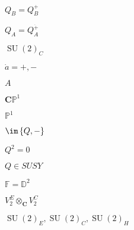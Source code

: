 \begin{preview}
\setcounter{equation}{0}%
\( Q_B = Q_B^+ \)
\end{preview}

\begin{preview}
\setcounter{equation}{0}%
\( Q_A = Q_A^{\dot{+}} \)
\end{preview}

\begin{preview}
\setcounter{equation}{0}%
\( \operatorname{SU}(2)_C \)
\end{preview}

\begin{preview}
\setcounter{equation}{0}%
\( \dot{a} = +,- \)
\end{preview}

\begin{preview}
\setcounter{equation}{0}%
\( A \)
\end{preview}

\begin{preview}
\setcounter{equation}{0}%
\( \mathbf{C}\mathbb{P}^1 \)
\end{preview}

\begin{preview}
\setcounter{equation}{0}%
\( \mathbb{P}^1 \)
\end{preview}

\begin{preview}
\setcounter{equation}{0}%
\( \im \left\{ Q,- \right\} \)
\end{preview}

\begin{preview}
\setcounter{equation}{0}%
\( Q ^2=0\)
\end{preview}

\begin{preview}
\setcounter{equation}{0}%
\( Q \in SUSY \)
\end{preview}

\begin{preview}
\setcounter{equation}{0}%
\( \mathbb{F} = \mathbb{D}^2 \)
\end{preview}

\begin{preview}
\setcounter{equation}{0}%
\( V_2^E \otimes _{\mathbf{C}} V_2^C \)
\end{preview}

\begin{preview}
\setcounter{equation}{0}%
\( \operatorname{SU}(2)_E, \operatorname{SU}(2)_C, \operatorname{SU}(2)_H \)
\end{preview}

